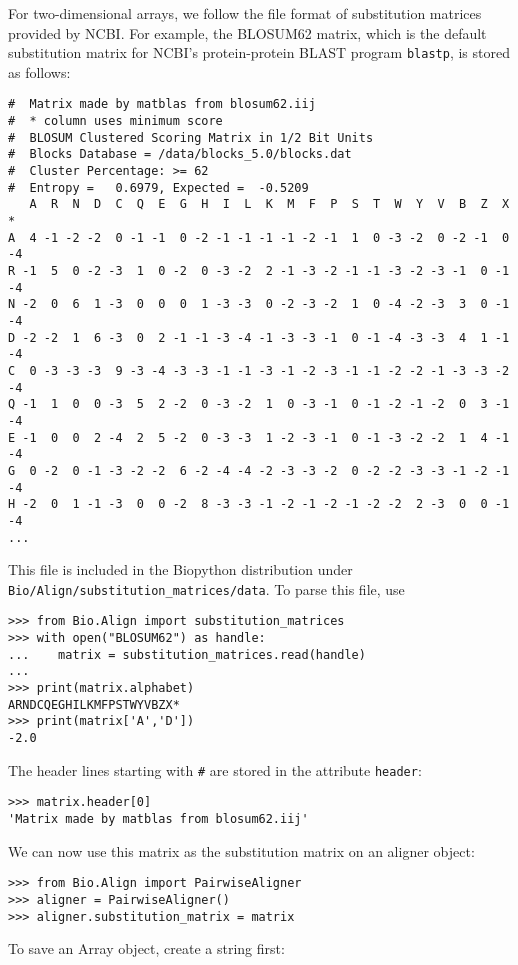 For two-dimensional arrays, we follow the file format of substitution matrices provided by NCBI. For example, the BLOSUM62 matrix, which is the default substitution matrix for NCBI's protein-protein BLAST \cite{altschul1990} program \verb+blastp+, is stored as follows:
\begin{verbatim}
#  Matrix made by matblas from blosum62.iij
#  * column uses minimum score
#  BLOSUM Clustered Scoring Matrix in 1/2 Bit Units
#  Blocks Database = /data/blocks_5.0/blocks.dat
#  Cluster Percentage: >= 62
#  Entropy =   0.6979, Expected =  -0.5209
   A  R  N  D  C  Q  E  G  H  I  L  K  M  F  P  S  T  W  Y  V  B  Z  X  *
A  4 -1 -2 -2  0 -1 -1  0 -2 -1 -1 -1 -1 -2 -1  1  0 -3 -2  0 -2 -1  0 -4 
R -1  5  0 -2 -3  1  0 -2  0 -3 -2  2 -1 -3 -2 -1 -1 -3 -2 -3 -1  0 -1 -4 
N -2  0  6  1 -3  0  0  0  1 -3 -3  0 -2 -3 -2  1  0 -4 -2 -3  3  0 -1 -4 
D -2 -2  1  6 -3  0  2 -1 -1 -3 -4 -1 -3 -3 -1  0 -1 -4 -3 -3  4  1 -1 -4 
C  0 -3 -3 -3  9 -3 -4 -3 -3 -1 -1 -3 -1 -2 -3 -1 -1 -2 -2 -1 -3 -3 -2 -4 
Q -1  1  0  0 -3  5  2 -2  0 -3 -2  1  0 -3 -1  0 -1 -2 -1 -2  0  3 -1 -4 
E -1  0  0  2 -4  2  5 -2  0 -3 -3  1 -2 -3 -1  0 -1 -3 -2 -2  1  4 -1 -4 
G  0 -2  0 -1 -3 -2 -2  6 -2 -4 -4 -2 -3 -3 -2  0 -2 -2 -3 -3 -1 -2 -1 -4 
H -2  0  1 -1 -3  0  0 -2  8 -3 -3 -1 -2 -1 -2 -1 -2 -2  2 -3  0  0 -1 -4 
...
\end{verbatim}
This file is included in the Biopython distribution under \verb+Bio/Align/substitution_matrices/data+. To parse this file, use

\begin{verbatim}
>>> from Bio.Align import substitution_matrices
>>> with open("BLOSUM62") as handle:
...    matrix = substitution_matrices.read(handle)
...
>>> print(matrix.alphabet)
ARNDCQEGHILKMFPSTWYVBZX*
>>> print(matrix['A','D'])
-2.0
\end{verbatim}
The header lines starting with \verb+#+ are stored in the attribute \verb+header+:

\begin{verbatim}
>>> matrix.header[0]
'Matrix made by matblas from blosum62.iij'
\end{verbatim}
We can now use this matrix as the substitution matrix on an aligner object:

\begin{verbatim}
>>> from Bio.Align import PairwiseAligner
>>> aligner = PairwiseAligner()
>>> aligner.substitution_matrix = matrix
\end{verbatim}
To save an Array object, create a string first:

